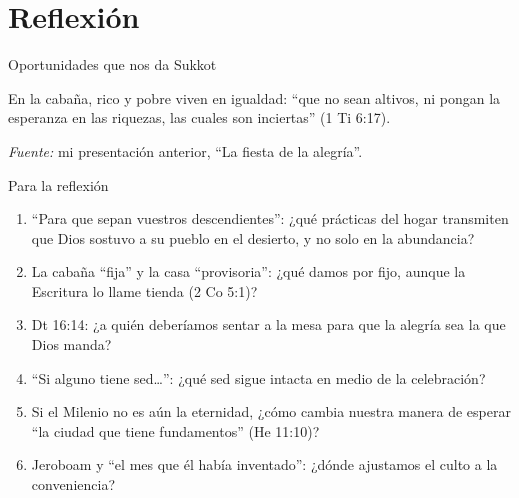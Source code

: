 \section{Reflexión}

\begin{frame}{Oportunidades que nos da Sukkot}
\centering
{}\par\medskip
\scriptsize En la cabaña, rico y pobre viven en igualdad: ``que no sean altivos, ni pongan la esperanza en las riquezas, las cuales son inciertas'' (1 Ti 6:17).\par\smallskip
{\fontsize{6}{7}\selectfont\color{sepia}\textit{Fuente:} mi presentación anterior, ``La fiesta de la alegría''.}
\end{frame}

\begin{frame}{Para la reflexión}
\small
\begin{enumerate}
\item ``Para que sepan vuestros descendientes'': ¿qué prácticas del hogar transmiten que Dios sostuvo a su pueblo en el desierto, y no solo en la abundancia?
\item La cabaña ``fija'' y la casa ``provisoria'': ¿qué damos por fijo, aunque la Escritura lo llame tienda (2 Co 5:1)?
\item Dt 16:14: ¿a quién deberíamos sentar a la mesa para que la alegría sea la que Dios manda?
\item ``Si alguno tiene sed\ldots'': ¿qué sed sigue intacta en medio de la celebración?
\item Si el Milenio no es aún la eternidad, ¿cómo cambia nuestra manera de esperar ``la ciudad que tiene fundamentos'' (He 11:10)?
\item Jeroboam y ``el mes que él había inventado'': ¿dónde ajustamos el culto a la conveniencia?
\end{enumerate}
\end{frame}

